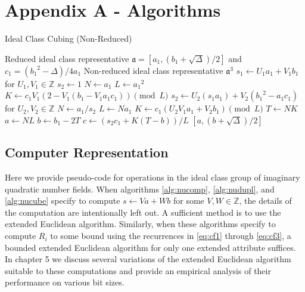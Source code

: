 \documentclass{ucalgthes1}
\theoremstyle{plain}
\theoremstyle{definition}
\newcommand{\ZZ}{\mathbb{Z}}
\begin{document}
\chapter*{Appendix A - Algorithms}

\begin{algorithm}[h]
\caption{Ideal Class Cubing (Non-Reduced)}
\label{alg:idealCube}
\begin{algorithmic}[1]
\REQUIRE Reduced ideal class representative $\mathfrak a = \left[a_1, (b_1 + \sqrt\Delta)/2\right]$ and $c_1 = ({b_1}^2-\Delta)/4a_1$
\ENSURE Non-reduced ideal class representative ${\mathfrak a}^3$
\STATE $s_1 \gets U_1a_1 + V_1b_1$ for $U_1,V_1 \in \ZZ$
	\STATE $s_2 \gets 1$
	\STATE $N \gets a_1$
	\STATE $L \gets {a_1}^2$
	\STATE $K \gets c_1V_1(2-V_1(b_1-V_1a_1c_1)) \pmod L$
\ELSE
	\STATE $s_2 \gets U_2(s_1a_1) + V_2({b_1}^2-a_1c_1)$ for $U_2, V_2 \in \ZZ$
	\STATE $N \gets a_1/s_2$
	\STATE $L \gets Na_1$
	\STATE $K \gets c_1(U_2V_1a_1+V_2b_1) \pmod L$
\ENDIF
\STATE $T \gets NK$
\STATE $a \gets NL$
\STATE $b \gets b_1 - 2T$
\STATE $c \gets (s_2c_1+K(T-b))/L$ 
\RETURN $[a, (b+\sqrt\Delta)/2]$ 
\end{algorithmic}
\end{algorithm}




\bigbreak
\section{Computer Representation}
\label{section:computerRepresentation}

Here we provide pseudo-code for operations in the ideal class group of imaginary quadratic number fields.  When algorithms \ref{alg:nucomp}, \ref{alg:nudupl}, and \ref{alg:nucube} specify to compute $s \leftarrow Va + Wb$ for some $V,W \in \ZZ$, the details of the computation are intentionally left out.  A sufficient method is to use the extended Euclidean algorithm.  Similarly, when these algorithms specify to compute $R_i$ to some bound using the recurrences in \eqref{eq:cf1} through \eqref{eq:cf3}, a bounded extended Euclidean algorithm for only one extended attribute suffices. In chapter 5 we discuss several variations of the extended Euclidean algorithm suitable to these computations and provide an empirical analysis of their performance on various bit sizes.
\end{document}
